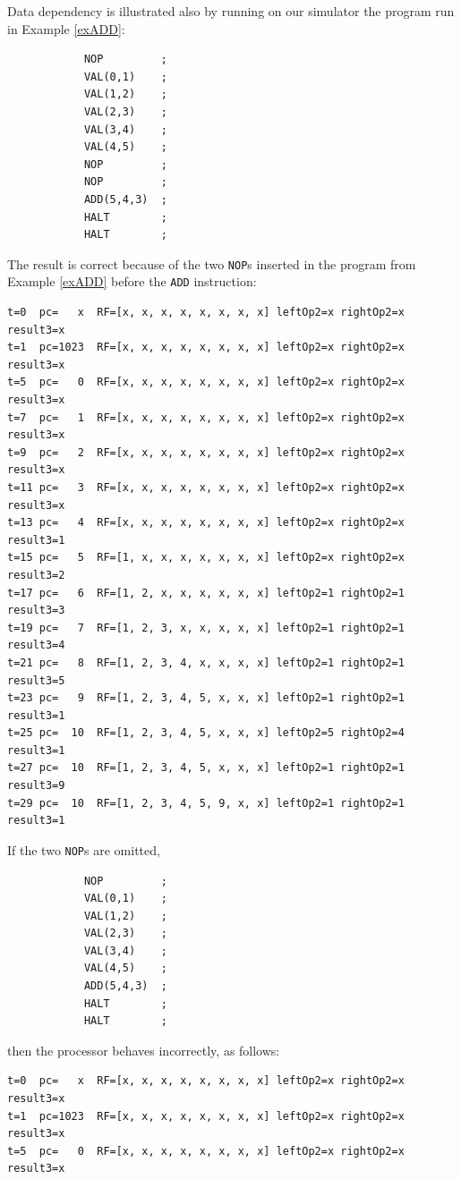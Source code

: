 \begin{exemplu}\label{dataDepSim}
Data dependency is illustrated also by running on our simulator the  program run in Example \ref{exADD}:
\begin{verbatim}
            NOP         ;
            VAL(0,1)    ;
            VAL(1,2)    ;
            VAL(2,3)    ;
            VAL(3,4)    ;
            VAL(4,5)    ;
            NOP         ;
            NOP         ;
            ADD(5,4,3)  ;
            HALT        ;
            HALT        ;
\end{verbatim}
The result is correct because of the two {\tt NOP}s inserted in the program from Example \ref{exADD} before the {\tt ADD} instruction:
{\small
\begin{verbatim}
t=0  pc=   x  RF=[x, x, x, x, x, x, x, x] leftOp2=x rightOp2=x result3=x
t=1  pc=1023  RF=[x, x, x, x, x, x, x, x] leftOp2=x rightOp2=x result3=x
t=5  pc=   0  RF=[x, x, x, x, x, x, x, x] leftOp2=x rightOp2=x result3=x
t=7  pc=   1  RF=[x, x, x, x, x, x, x, x] leftOp2=x rightOp2=x result3=x
t=9  pc=   2  RF=[x, x, x, x, x, x, x, x] leftOp2=x rightOp2=x result3=x
t=11 pc=   3  RF=[x, x, x, x, x, x, x, x] leftOp2=x rightOp2=x result3=x
t=13 pc=   4  RF=[x, x, x, x, x, x, x, x] leftOp2=x rightOp2=x result3=1
t=15 pc=   5  RF=[1, x, x, x, x, x, x, x] leftOp2=x rightOp2=x result3=2
t=17 pc=   6  RF=[1, 2, x, x, x, x, x, x] leftOp2=1 rightOp2=1 result3=3
t=19 pc=   7  RF=[1, 2, 3, x, x, x, x, x] leftOp2=1 rightOp2=1 result3=4
t=21 pc=   8  RF=[1, 2, 3, 4, x, x, x, x] leftOp2=1 rightOp2=1 result3=5
t=23 pc=   9  RF=[1, 2, 3, 4, 5, x, x, x] leftOp2=1 rightOp2=1 result3=1
t=25 pc=  10  RF=[1, 2, 3, 4, 5, x, x, x] leftOp2=5 rightOp2=4 result3=1
t=27 pc=  10  RF=[1, 2, 3, 4, 5, x, x, x] leftOp2=1 rightOp2=1 result3=9
t=29 pc=  10  RF=[1, 2, 3, 4, 5, 9, x, x] leftOp2=1 rightOp2=1 result3=1
\end{verbatim}
}
If the two {\tt NOP}s are omitted,
\begin{verbatim}
            NOP         ;
            VAL(0,1)    ;
            VAL(1,2)    ;
            VAL(2,3)    ;
            VAL(3,4)    ;
            VAL(4,5)    ;
            ADD(5,4,3)  ;
            HALT        ;
            HALT        ;
\end{verbatim}
then the processor behaves incorrectly, as follows:
\begin{verbatim}
t=0  pc=   x  RF=[x, x, x, x, x, x, x, x] leftOp2=x rightOp2=x result3=x
t=1  pc=1023  RF=[x, x, x, x, x, x, x, x] leftOp2=x rightOp2=x result3=x
t=5  pc=   0  RF=[x, x, x, x, x, x, x, x] leftOp2=x rightOp2=x result3=x

\end{verbatim}
\end{exemplu}
